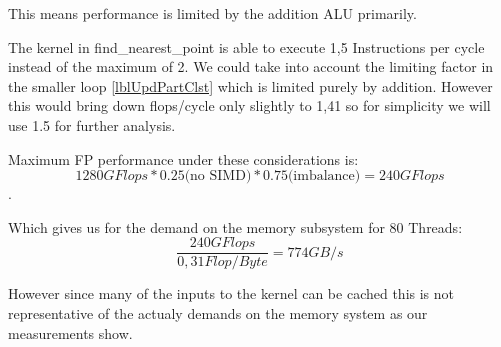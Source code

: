 \documentclass[]{article}
\begin{document}
This means performance is limited by the addition ALU primarily.

The kernel in find\_nearest\_point is able to execute 1,5 Instructions per cycle instead of the maximum of 2.
We could take into account the limiting factor in the smaller loop \autoref{lblUpdPartClst} which is limited purely by addition.
However this would bring down flops/cycle only slightly to 1,41 so for simplicity we will use 1.5 for further analysis.

Maximum FP performance under these considerations is:
$$1280 GFlops * 0.25 \text{(no SIMD)}  * 0.75 \text{(imbalance)} = 240 GFlops$$.

Which gives us for the demand on the memory subsystem for 80 Threads:
$$\frac{240 GFlops}{0,31 Flop/Byte} = 774 GB/s$$

However since many of the inputs to the kernel can be cached this is not representative of the actualy demands on the memory system as our measurements show.
\end{document}
